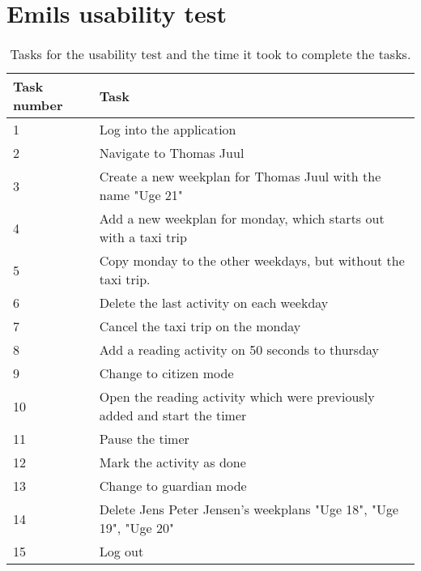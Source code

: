 \section{Emils usability test}\label{usability-test-14-05-emil}
\begin{table}[H]
    \small
    \begin{tabular}{|p{1.3cm}|p{12cm}|}
    \hline
    Task number      &Task                                                               \\ \hline
    1 & Log into the application                                                              \\ \hline
    2 & Navigate to Thomas Juul                                                          \\ \hline
    3 & Create a new weekplan for Thomas Juul with the name "Uge 21"                      \\ \hline
    4 & Add a new weekplan for monday, which starts out with a taxi trip                            \\ \hline
    5 & Copy monday to the other weekdays, but without the taxi trip.                             \\ \hline
    6 & Delete the last activity on each weekday                                                \\ \hline
    7 & Cancel the taxi trip on the monday                                                      \\ \hline
    8 & Add a reading activity on 50 seconds to thursday                                      \\ \hline
    9 & Change to citizen mode                                                       \\ \hline
    10 & Open the reading activity which were previously added and start the timer     \\ \hline
    11 & Pause the timer                                                                  \\ \hline
    12 & Mark the activity as done                                                       \\ \hline
    13 & Change to guardian mode                                                        \\ \hline
    14 & Delete Jens Peter Jensen's weekplans "Uge 18", "Uge 19", "Uge 20"              \\ \hline
    15 & Log out                                                                        \\ \hline
    \end{tabular}
    \caption{Tasks for the usability test and the time it took to complete the tasks.}\label{table:emil_usability_tasks}
\end{table}

